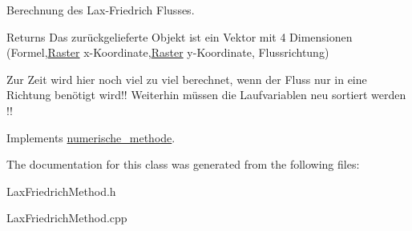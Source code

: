 Berechnung des Lax-\/\-Friedrich Flusses. \begin{DoxyReturn}{Returns}
Das zurückgelieferte Objekt ist ein Vektor mit 4 Dimensionen (Formel,\hyperlink{classRaster}{Raster} x-\/\-Koordinate,\hyperlink{classRaster}{Raster} y-\/\-Koordinate, Flussrichtung)
\end{DoxyReturn}
Zur Zeit wird hier noch viel zu viel berechnet, wenn der Fluss nur in eine Richtung benötigt wird!! Weiterhin müssen die Laufvariablen neu sortiert werden !! 

Implements \hyperlink{classnumerische__methode_af40ea9c1bfbc9d480e7e0d188f2eccf8}{numerische\-\_\-methode}.



The documentation for this class was generated from the following files\-:\begin{DoxyCompactItemize}
\item 
Lax\-Friedrich\-Method.\-h\item 
Lax\-Friedrich\-Method.\-cpp\end{DoxyCompactItemize}
